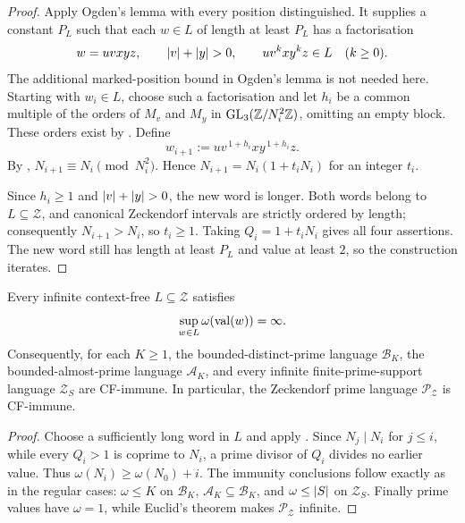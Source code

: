 \begin{proof}
  Apply Ogden's lemma with every position distinguished. It supplies a
  constant \(P_L\) such that each \(w\in L\) of length at least \(P_L\)
  has a factorisation
  \[
    w=uvxyz,\qquad \lvert v \rvert+\lvert y \rvert>0,\qquad
    uv^kxy^kz\in L\quad(k\ge0).
  \]
  The additional marked-position bound in Ogden's lemma is not needed
  here. Starting with \(w_i\in L\), choose such a factorisation and
  let \(h_i\) be a common multiple of the orders of \(M_v\) and \(M_y\)
  in
  \(\operatorname{GL}_3(\mathbb{Z}/N_i^2\mathbb{Z})\), omitting an empty block. These
  orders exist by
  . Define
  \[
    w_{i+1}:=uv^{\,1+h_i}xy^{\,1+h_i}z.
  \]
  By ,
  \(N_{i+1}\equiv N_i\pmod {N_i^2}\). Hence
  \(N_{i+1}=N_i(1+t_iN_i)\) for an integer \(t_i\).

  Since \(h_i\ge1\) and \(\lvert v \rvert+\lvert y \rvert>0\), the new word is longer.
  Both words belong to \(L\subseteq\mathcal Z\), and canonical
  Zeckendorf intervals are strictly ordered by length; consequently
  \(N_{i+1}>N_i\), so \(t_i\ge1\). Taking
  \(Q_i=1+t_iN_i\) gives all four assertions. The new word still has
  length at least \(P_L\) and value at least \(2\), so the construction
  iterates.
\end{proof}

\begin{corollary}
  \label{cor:zeckendorf-context-free-immunity-package}
  Every infinite context-free \(L\subseteq\mathcal Z\) satisfies
  \[
    \sup_{w\in L}\omega(\operatorname{val}(w))=\infty.
  \]
  Consequently, for each \(K\ge1\), the bounded-distinct-prime language
  \(\mathcal B_K\), the bounded-almost-prime language \(\mathcal A_K\),
  and every infinite finite-prime-support language \(\mathcal Z_S\)
  are CF-immune. In particular, the Zeckendorf prime language
  \(\mathcal P_{\mathcal Z}\) is CF-immune.
\end{corollary}

\begin{proof}
  Choose a sufficiently long word in \(L\) and apply
  . Since
  \(N_j\mid N_i\) for \(j\le i\), while every \(Q_i>1\) is coprime to
  \(N_i\), a prime divisor of \(Q_i\) divides no earlier value. Thus
  \(\omega(N_i)\ge\omega(N_0)+i\). The immunity conclusions follow
  exactly as in the regular cases: \(\omega\le K\) on \(\mathcal B_K\),
  \(\mathcal A_K\subseteq\mathcal B_K\), and
  \(\omega\le\lvert S \rvert\) on \(\mathcal Z_S\). Finally prime values have
  \(\omega=1\), while Euclid's theorem makes
  \(\mathcal P_{\mathcal Z}\) infinite.
\end{proof}

